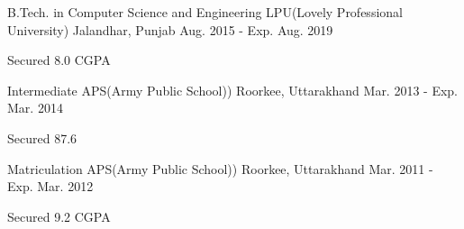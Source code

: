 

\begin{cventries}

  \cventry
    {B.Tech. in Computer Science and Engineering} %
    {LPU(Lovely Professional University)} %
    {Jalandhar, Punjab} %
    {Aug. 2015 - Exp. Aug. 2019} %
    {
      \begin{cvitems} %
        \item {Secured 8.0 CGPA }
      \end{cvitems}
    }


  \cventry
    {Intermediate} %
    {APS(Army Public School))} %
    {Roorkee, Uttarakhand} %
    {Mar. 2013 - Exp. Mar. 2014} %
    {
      \begin{cvitems} %
        \item {Secured 87.6 }
      \end{cvitems}
    }


  \cventry
    {Matriculation} %
    {APS(Army Public School))} %
    {Roorkee, Uttarakhand} %
    {Mar. 2011 - Exp. Mar. 2012} %
    {
      \begin{cvitems} %
        \item {Secured 9.2 CGPA }
      \end{cvitems}
    }



\end{cventries}

